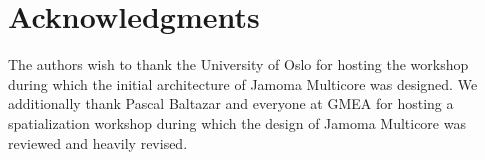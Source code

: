 \documentclass[twoside,a4paper]{article}
\begin{document}
%
%
%
%




\section{Acknowledgments}

The authors wish to thank the University of Oslo for hosting the workshop during which the initial architecture of Jamoma Multicore was designed.  We additionally thank Pascal Baltazar and everyone at GMEA for hosting a spatialization workshop during which the design of Jamoma Multicore was reviewed and heavily revised.




\end{document}
